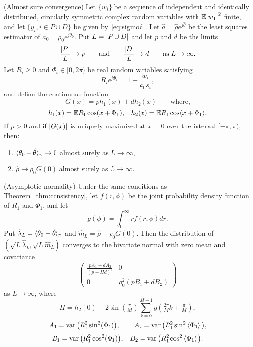 \documentclass[journal]{IEEEtran}
\begin{document}
\begin{theorem}\label{thm:consistency} (Almost sure convergence)
Let $\{w_i\}$ be a sequence of independent and identically distributed, circularly symmetric complex random variables with ${\mathbb E} {\left\vert w_1 \right\vert}^2$ finite, and let $\{y_i, i \in P \cup D\}$ be given by~\eqref{eq:sigmod}.   Let $\hat{a} = \hat{\rho}e^{j\hat{\theta}}$ be the least squares estimator of $a_0 = \rho_0e^{j\theta_0}$. %
Put $L = {\left\vert P \cup D \right\vert}$ and let $p$ and $d$ be the limits
\[
\frac{{\left\vert P \right\vert}}{L} \rightarrow p \qquad \text{and} \qquad \frac{{\left\vert D \right\vert}}{L} \rightarrow d \qquad \text{as $L \rightarrow \infty$.}
\] 
Let $R_i \geq 0$ and $\Phi_i \in [0,2\pi)$ be real random variables satisfying
\begin{equation}\label{eq:RiandPhii}
R_ie^{j\Phi_i} = 1 + \frac{w_i}{a_0 s_i} ,
\end{equation}
and define the continuous function
\[
G(x) = p h_1(x) + d h_2(x) \qquad \text{where,}
\]
\[
h_1(x) = {\mathbb E} R_1 \cos(x + \Phi_1), \;\;\; h_2(x) =  {\mathbb E} R_1 \cos\langle  x + \Phi_1 \rangle.
\]
If $p > 0$ and if ${\left\vert G(x) \right\vert}$ is uniquely maximised at $x = 0$ over the interval $[-\pi,\pi)$, then:
\begin{enumerate}
\item $\langle \theta_0 - \hat{\theta} \rangle_\pi \rightarrow 0$ almost surely as $L \rightarrow \infty$,
\item $\hat{\rho} \rightarrow \rho_0 G(0)$ almost surely as $L \rightarrow \infty$.
\end{enumerate}
\end{theorem}

\begin{theorem}\label{thm:normality} (Asymptotic normality)
Under the same conditions as Theorem~\ref{thm:consistency}, let $f(r,\phi)$ be the joint probability density function of $R_1$ and $\Phi_1$, and let
\[
g(\phi) = \int_{0}^{\infty} r f(r,\phi) dr.
\]
Put $\hat{\lambda}_L = \langle \theta_0 - \hat{\theta} \rangle_\pi$ and $\hat{m}_L = \hat{\rho} - \rho_0 G(0)$. %
Then the distribution of $(\sqrt{L}\hat{\lambda}_L, \sqrt{L}\hat{m}_L)$ converges to the bivariate normal with zero mean and covariance
\[
\left( \begin{array}{cc} 
\frac{pA_1 + dA_2}{(p + H d)^2} & 0 \\
0 & \rho_0^2(pB_1 + dB_2)
\end{array} \right)
\]
as $L \rightarrow \infty$, where
\[
H = h_2(0) -  2 \sin(\tfrac{\pi}{M}) \sum_{k = 0}^{M-1} g(\tfrac{2\pi}{M}k + \tfrac{\pi}{M}),
\]
\[
A_1 = \operatorname{var}\big( R_1^2\sin^2(\Phi_1) \big), \qquad A_2 = \operatorname{var}\big( R_1^2\sin^2\left\langle \Phi_1 \right\rangle \big),
\]
\[
B_1 = \operatorname{var}\big( R_1^2 \cos^2(\Phi_1) \big), \;\;\; B_2 = \operatorname{var}\big( R_1^2 \cos^2\left\langle \Phi_1 \right\rangle \big).
\]
\end{theorem}
\end{document}
